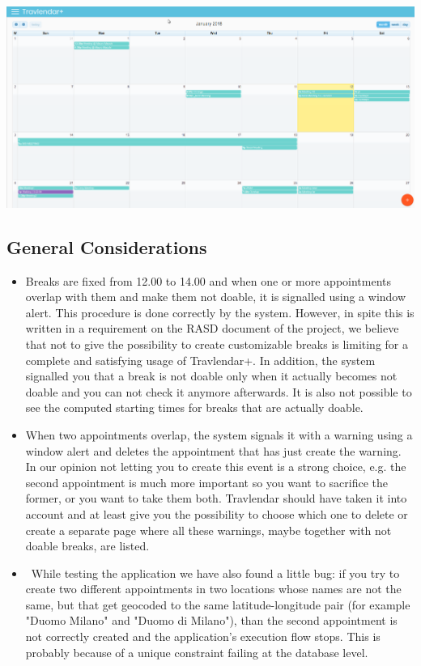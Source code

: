 \begin{center}
\includegraphics[width=\textwidth]{Images/CalendarPage}
\end{center}

\subsection{General Considerations}
\begin{itemize}
	\item Breaks are fixed from 12.00 to 14.00 and when one or more appointments overlap with them and make them not doable, it is signalled using a window alert. This procedure is done correctly by the system. However, in spite this is written in a requirement on the RASD document of the project, we believe that not to give the possibility to create customizable breaks is limiting for a complete and satisfying usage of Travlendar+. In addition, the system signalled you that a break is not doable only when it actually becomes not doable and you can not check it anymore afterwards. It is also not possible to see the computed starting times for breaks that are actually doable.
	\item When two appointments overlap, the system signals it with a warning using a window alert and deletes the appointment that has just create the warning. In our opinion not letting you to create this event is a strong choice, e.g. the second appointment is much more important so you want to sacrifice the former, or you want to take them both. Travlendar should have taken it into account and at least give you the possibility to choose which one to delete or create a separate page where all these warnings, maybe together with not doable breaks, are listed.
	\item~While testing the application we have also found a little bug: if you try to create two different appointments in two locations whose names are not the same, but that get geocoded to the same latitude-longitude pair (for example "Duomo Milano" and "Duomo di Milano"), than the second appointment is not correctly created and the application's execution flow stops. This is probably because of a unique constraint failing at the database level.
\end{itemize}
